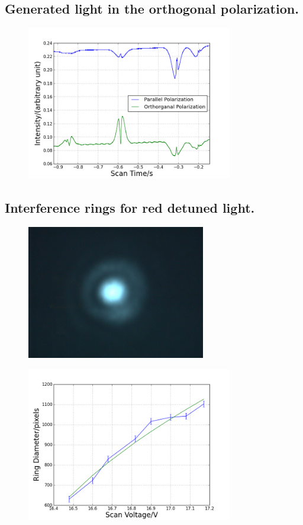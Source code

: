 \documentclass[aps,twocolumn,secnumarabic,balancelastpage,amsmath,amssymb,nofootinbib]{revtex4}
\begin{document}
\subsection{Generated light in the orthogonal polarization.}
\begin{figure}
  \includegraphics[width=9cm]{../data/5-16_csv/intensities.png}
  \caption{}
  \label{intensities}
\end{figure}

\subsection{Interference rings for red detuned light.}
\begin{figure}
  \includegraphics[width=7.8cm]{rings.png}
  \caption{}
  \label{rings}
\end{figure}
\begin{figure}
  \includegraphics[width=9cm]{../data/5-16/ring-fit.png}
  \caption{}
  \label{ring_fit}
\end{figure}
\end{document}
